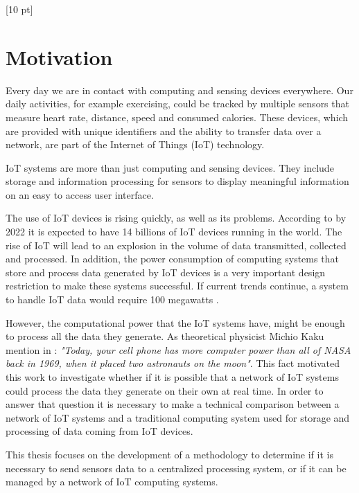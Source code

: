 \titleformat{\chapter}{\Huge\bfseries}{\thechapter}{0 pt}{\rule{340 pt}{3 pt}\\}
\titlespacing{\chapter}{100 pt}{-25 pt}{40 pt}[10 pt]	
\pagestyle{fancy}
\fancyhead[RO,RE]{\thepage}
\fancyfoot[CO,CE]{}

\chapter*{Motivation}

\normalsize
\noindent
Every day we are in contact with computing and sensing devices everywhere. Our
daily activities, for example exercising, could be tracked by multiple sensors
that measure heart rate, distance, speed and consumed calories. These devices,
which are provided with unique identifiers and the ability to transfer data
over a network, are part of the Internet of Things (IoT) technology.

IoT systems are more than just computing and sensing devices. They include
storage and information processing for sensors to display meaningful
information on an easy to access user interface. 

The use of IoT devices is rising quickly, as well as its problems. According to
\cite{Benkhelifa} by 2022 it is expected to have 14 billions of IoT devices
running in the world. The rise of IoT will lead to an explosion in the volume
of data transmitted, collected and processed. In addition, the power
consumption of computing systems that store and process data generated by IoT
devices is a very important design restriction to make these systems
successful. If current trends continue, a system to handle IoT data would
require 100 megawatts \cite{Xizhou}.

However, the computational power that the IoT systems have, might be enough to
process all the data they generate. As theoretical physicist Michio Kaku
mention in \cite{Michio}: \textit{"Today, your cell phone has more computer
power than all of NASA back in 1969, when it placed two astronauts on the
moon"}. This fact motivated this work to investigate whether if it is possible
that a network of IoT systems could process the data they generate on their own
at real time. In order to answer that question it is necessary to make a
technical comparison between a network of IoT systems and a traditional
computing system used for storage and processing of data coming from IoT
devices. 

This thesis focuses on the development of a methodology to determine if it is
necessary to send sensors data to a centralized processing system, or if it can
be managed by a network of IoT computing systems. 

\clearpage
